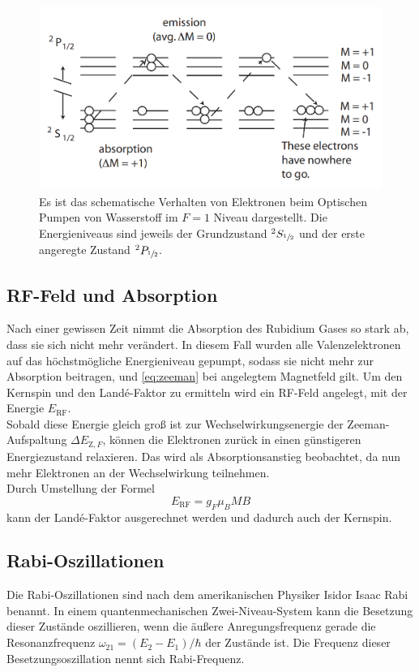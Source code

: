 \begin{figure}[H]
    \centering
    \includegraphics[scale=0.4]{figures/optic.png}
    \caption{Es ist das schematische Verhalten von Elektronen beim Optischen Pumpen von Wasserstoff im $F=1$ Niveau dargestellt.
    Die Energieniveaus sind jeweils der Grundzustand $^2S_{\sfrac{1}{2}}$ und der erste angeregte Zustand $^2P_{\sfrac{1}{2}}$.\cite{pdf_anleitung}}
    \label{fig:optic}
\end{figure}

\subsection{RF-Feld und Absorption}
Nach einer gewissen Zeit nimmt die Absorption des Rubidium Gases so stark ab, dass sie sich nicht mehr verändert.
In diesem Fall wurden alle Valenzelektronen auf das höchstmögliche Energieniveau gepumpt, sodass sie nicht mehr zur Absorption beitragen, und \autoref{eq:zeeman} bei angelegtem Magnetfeld gilt.
Um den Kernspin und den Landé-Faktor zu ermitteln wird ein RF-Feld angelegt, mit der Energie $E_\text{RF}$.\\
Sobald diese Energie gleich groß ist zur Wechselwirkungsenergie der Zeeman-Aufspaltung $\Delta E_{\text{Z},F}$, können die Elektronen zurück in einen günstigeren Energiezustand relaxieren.
Das wird als Absorptionsanstieg beobachtet, da nun mehr Elektronen an der Wechselwirkung teilnehmen.\\
Durch Umstellung der Formel
\begin{equation}
    E_\text{RF} = g_F \mu_B M B
    \label{eq:zeeman_frequenz}
\end{equation}
kann der Landé-Faktor ausgerechnet werden und dadurch auch der Kernspin.

\subsection{Rabi-Oszillationen}
Die Rabi-Oszillationen sind nach dem amerikanischen Physiker Isidor Isaac Rabi benannt.
In einem quantenmechanischen Zwei-Niveau-System kann die Besetzung dieser Zustände oszillieren, wenn die äußere Anregungsfrequenz gerade die Resonanzfrequenz $\omega_{21} = (E_2 -E_1)/\hbar$ der Zustände ist.
Die Frequenz dieser Besetzungsoszillation nennt sich Rabi-Frequenz.